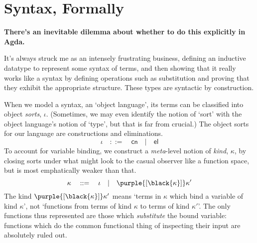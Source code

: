 \documentclass[natbib]{article}
\begin{document}
\section{Syntax, Formally}

\newcommand{\cns}{\mathsf{cn}}
\newcommand{\elm}{\mathsf{el}}
\newcommand{\bnd}[1]{\purple{[\black{#1}]}}
\newcommand{\pic}{\blue{\Uppi}}
\newcommand{\lac}{\red{\uplambda}}
\newcommand{\elc}{\green{\upupsilon}}
\newcommand{\apc}{\green{\upalpha}}
\newcommand{\tyc}{\green{\upepsilon}}

\textbf{There's an inevitable dilemma about whether to do this explicitly in Agda.}

It's always struck me as an intensely frustrating business, defining an inductive datatype to represent some syntax of terms, and then showing that it really works like a syntax by defining operations such as substitution and proving that they exhibit the appropriate structure. These types are syntactic by construction.

When we model a syntax, an `object language', its terms can be classified into object \emph{sorts}, $\iota$. (Sometimes, we may even identify the notion of `sort' with the object language's notion of `type', but that is far from crucial.) The object sorts for our language are constructions and eliminations.
\[
  \iota \quad::=\quad \cns \quad|\quad \elm
\]
To account for variable binding, we construct a \emph{meta}-level notion of \emph{kind}, $\kappa$, by closing sorts under what might look to the casual observer like a function space, but is most emphatically weaker than that.
\[
  \kappa \quad::=\quad \iota \quad|\quad \bnd\kappa \kappa'
\]
The kind $\bnd\kappa \kappa'$ means `terms in $\kappa$ which bind a variable of kind $\kappa$', not `functions from terms of kind $\kappa$ to terms of kind $\kappa'$'. The only functions thus represented are those which
\emph{substitute} the bound variable: functions which do the common functional thing of inspecting their input are absolutely ruled out.
\end{document}
